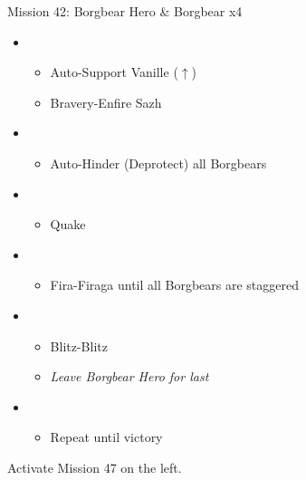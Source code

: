 \begin{battle}{Mission 42: Borgbear Hero \& Borgbear x4}
	\begin{itemize}
		\item \third
			\begin{itemize}
				\item Auto-Support Vanille ($\uparrow$)
				\item Bravery-Enfire Sazh
			\end{itemize}
		\item \second
			\begin{itemize}
				\item Auto-Hinder (Deprotect) all Borgbears
			\end{itemize}
		\item \first
			\begin{itemize}
				\item Quake
			\end{itemize}
		\item \fifth
			\begin{itemize}
				\item Fira-Firaga until all Borgbears are staggered
			\end{itemize}
		\item \first
			\begin{itemize}
				\item Blitz-Blitz
				\item \textit{Leave Borgbear Hero for last}
			\end{itemize}	
		\item \fourth
			\begin{itemize}
				\item Repeat until victory
			\end{itemize}														
	\end{itemize}
\end{battle}

Activate Mission 47 on the left.
\vfill

